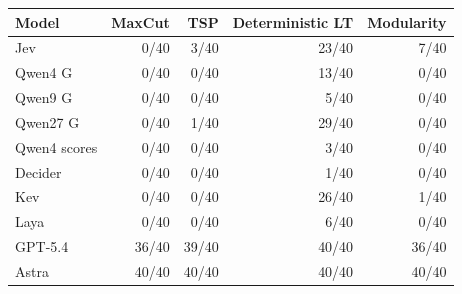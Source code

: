 \begin{tabular}{lrrrr}
\toprule
Model & MaxCut & TSP & Deterministic LT & Modularity \\
\midrule
Jev & 0/40 & 3/40 & 23/40 & 7/40 \\
Qwen4 G & 0/40 & 0/40 & 13/40 & 0/40 \\
Qwen9 G & 0/40 & 0/40 & 5/40 & 0/40 \\
Qwen27 G & 0/40 & 1/40 & 29/40 & 0/40 \\
Qwen4 scores & 0/40 & 0/40 & 3/40 & 0/40 \\
Decider & 0/40 & 0/40 & 1/40 & 0/40 \\
Kev & 0/40 & 0/40 & 26/40 & 1/40 \\
Laya & 0/40 & 0/40 & 6/40 & 0/40 \\
\midrule
GPT-5.4 & 36/40 & 39/40 & 40/40 & 36/40 \\
Astra & 40/40 & 40/40 & 40/40 & 40/40 \\
\bottomrule
\end{tabular}
